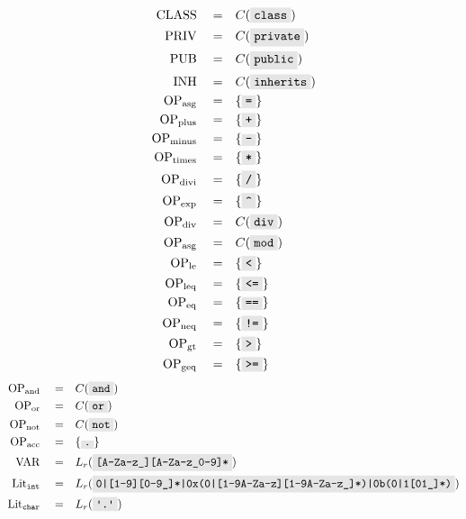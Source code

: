 \documentclass{article}
\newcommand{\code}[1]{\colorbox{gray!20}{\texttt{#1}}}
\begin{document}
\begin{multicols}{2}
\begin{align}
    \mathrm{CLASS}\quad =&\quad C( \code{class} ) \\
    \mathrm{PRIV}\quad =&\quad C( \code{private} ) \\
    \mathrm{PUB}\quad =&\quad C( \code{public} ) \\
    \mathrm{INH}\quad =&\quad C( \code{inherits} ) \\
    \mathrm{OP}_\mathrm{asg}\quad =&\quad \{\code=\} \\
    \mathrm{OP}_\mathrm{plus}\quad =&\quad \{\code+\} \\
    \mathrm{OP}_\mathrm{minus}\quad =&\quad \{\code-\} \\
    \mathrm{OP}_\mathrm{times}\quad =&\quad \{\code*\} \\
    \mathrm{OP}_\mathrm{divi}\quad =&\quad \{\code/\} \\
    \mathrm{OP}_\mathrm{exp}\quad =&\quad \{\code\textasciicircum\} \\
    \mathrm{OP}_\mathrm{div}\quad =&\quad C(\code{div}) \\
    \mathrm{OP}_\mathrm{asg}\quad =&\quad C(\code{mod}) \\
    \mathrm{OP}_\mathrm{le}\quad =&\quad \{\code{<}\} \\
    \mathrm{OP}_\mathrm{leq}\quad =&\quad \{\code{<=}\} \\
    \mathrm{OP}_\mathrm{eq}\quad =&\quad \{\code{==}\} \\
    \mathrm{OP}_\mathrm{neq}\quad =&\quad \{\code{!=}\} \\
    \mathrm{OP}_\mathrm{gt}\quad =&\quad \{\code>\} \\
    \mathrm{OP}_\mathrm{geq}\quad =&\quad \{\code{>=}\}
\end{align}
\begin{align}
    \mathrm{OP}_\mathrm{and}\quad =&\quad C(\code{and}) \\
    \mathrm{OP}_\mathrm{or}\quad =&\quad C(\code{or}) \\
    \mathrm{OP}_\mathrm{not}\quad =&\quad C(\code{not}) \\
    \mathrm{OP}_\mathrm{acc}\quad =&\quad \{\code.\} \\
    \mathrm{VAR}\quad =& \quad L_r(\code{[A-Za-z\_][A-Za-z\_0-9]*} ) \\
    \mathrm{Lit}_{\mathtt{int}} \quad=&\quad L_r(\code{0|[1-9][0-9\_]*|0x(0|[1-9A-Za-z][1-9A-Za-z\_]*)|0b(0|1[01\_]*)}) \\
    \mathrm{Lit}_{\mathtt{char}}\quad =&\quad L_r( \code{\textquotesingle.\textquotesingle}) \\

\end{align}
\end{multicols}
\end{document}
